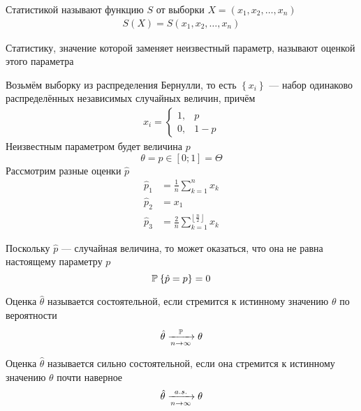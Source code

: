 \begin{definition}[Статистика]
  \label{def:statistic}
  Статистикой называют функцию $S$ от выборки
  $X=\left(x_1,x_2,\dots,x_n\right)$
  \begin{align*}
    S\left(X\right) = S\left(x_1, x_2, \dots, x_n\right)
  \end{align*}
\end{definition}
\begin{definition}[Оценка]Статистику,
  значение которой заменяет неизвестный параметр,
  называют оценкой этого параметра
\end{definition}
\begin{example}\label{example:bernulliEstimator}
  Возьмём выборку из распределения Бернулли,
  то есть $\left\{x_i\right\}$ --- набор одинаково распределённых
  независимых случайных величин, причём
  \begin{align*}
  x_i=
  \begin{cases}
    1,&p\\
    0,&1-p
  \end{cases}
  \end{align*}
  Неизвестным параметром будет величина $p$
  \begin{equation*}
    \theta = p \in \left[ 0; 1 \right] = \Theta
  \end{equation*}
  Рассмотрим разные оценки $\hat{p}$
  \begin{align*}
    \hat{p}_1&=\frac{1}{n}\sum_{k=1}^n x_k\\
    \hat{p}_2&=x_1\\
    \hat{p}_3&=
      \frac{2}{n}\sum_{k=1}^{\left\lfloor \frac{n}{2} \right\rfloor} x_k
  \end{align*}
\end{example}

\begin{remark}
Поскольку $\hat{p}$ --- случайная величина, то может оказаться,
что она не равна настоящему параметру $p$
$$\mathbb{P}_{{}}\left\{ \hat{p}=p \right\}=0$$
\end{remark}

\begin{definition}
  Оценка $\hat{\theta}$ называется состоятельной,
  если стремится к истинному значению $\theta$ по вероятности
  $$\hat{\theta}\xrightarrow[n\to\infty]{\mathbb{P}}\theta$$
\end{definition}

\begin{definition}
  Оценка $\hat{\theta}$ называется сильно состоятельной,
  если она стремится к истинному значению $\theta$ почти наверное
  $$\hat{\theta}\xrightarrow[n\to\infty]{a.s.}\theta$$
\end{definition}


